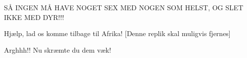 \documentclass[a4paper,11pt]{article}
\begin{document}
\begin{sketch}



 SÅ INGEN MÅ HAVE NOGET SEX MED NOGEN SOM HELST, OG SLET IKKE MED DYR!!!


 Hjælp, lad os komme tilbage til Afrika! [Denne replik skal muligvis fjernes]

 Arghhh!! Nu skræmte du dem væk!

\end{sketch}
\end{document}
